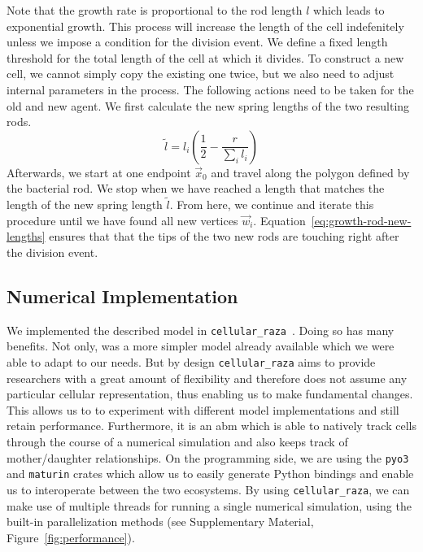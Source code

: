 \documentclass{article}
\begin{document}
Note that the growth rate is proportional to the rod length $l$ which leads to exponential growth.
This process will increase the length of the cell indefenitely unless we impose a condition for the
division event.
We define a fixed length threshold for the total length of the cell at which it divides.
To construct a new cell, we cannot simply copy the existing one twice, but we also need to adjust
internal parameters in the process.
The following actions need to be taken for the old and new agent.
We first calculate the new spring lengths of the two resulting rods.
\begin{equation}
    \tilde{l} = l_i\left(\frac{1}{2} - \frac{r}{\sum\limits_i l_i}\right)
    \label{eq:growth-rod-new-lengths}
\end{equation}
Afterwards, we start at one endpoint $\vec{x}_0$ and travel along the polygon defined by the
bacterial rod.
We stop when we have reached a length that matches the length of the new spring length $\tilde{l}$.
From here, we continue and iterate this procedure until we have found all new vertices $\vec{w}_i$.
Equation~\ref{eq:growth-rod-new-lengths} ensures that that the tips of the two new rods are touching
right after the division event.

\subsection{Numerical Implementation}

We implemented the described model in \texttt{cellular\_raza}~\cite{Pleyer2025}.
Doing so has many benefits.
Not only, was a more simpler model already available which we were able to adapt to our needs.
But by design \texttt{cellular\_raza} aims to provide researchers with a great amount of flexibility
and therefore does not assume any particular cellular representation, thus enabling us to make
fundamental changes.
This allows us to to experiment with different model implementations and still retain performance.
Furthermore, it is an \ac{abm} which is able to natively track cells through the course of a
numerical simulation and also keeps track of mother/daughter relationships.
On the programming side, we are using the \texttt{pyo3} and \texttt{maturin} crates which allow us
to easily generate Python bindings and enable us to interoperate between the two ecosystems.
By using \texttt{cellular\_raza}, we can make use of multiple threads for running a single numerical
simulation, using the built-in parallelization methods (see Supplementary Material,
Figure~\ref{fig:performance}).
\end{document}
